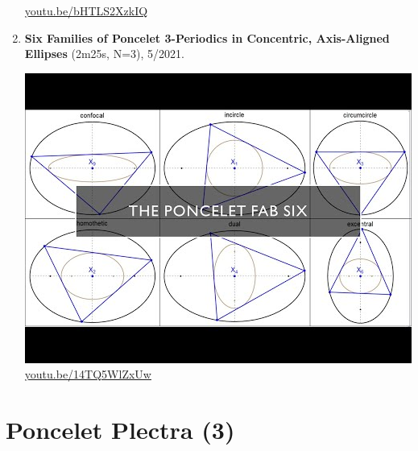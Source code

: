 \documentclass[12pt]{amsart}
\begin{document}
\begin{enumerate}[resume]
\begin{center}
\href{https://youtu.be/bHTLS2XzkIQ}{\url{youtu.be/bHTLS2XzkIQ}}\end{center}
% 
\item \textbf{Six Families of Poncelet 3-Periodics in Concentric, Axis-Aligned Ellipses} (2m25s, N=3), 5/2021. 
\begin{center}\includegraphics[width=.5\textwidth]{pics/14TQ5WlZxUw.jpg} \\ 
\href{https://youtu.be/14TQ5WlZxUw}{\url{youtu.be/14TQ5WlZxUw}}\end{center}
% 
\end{enumerate}

\section{Poncelet Plectra (3)}
\end{document}
